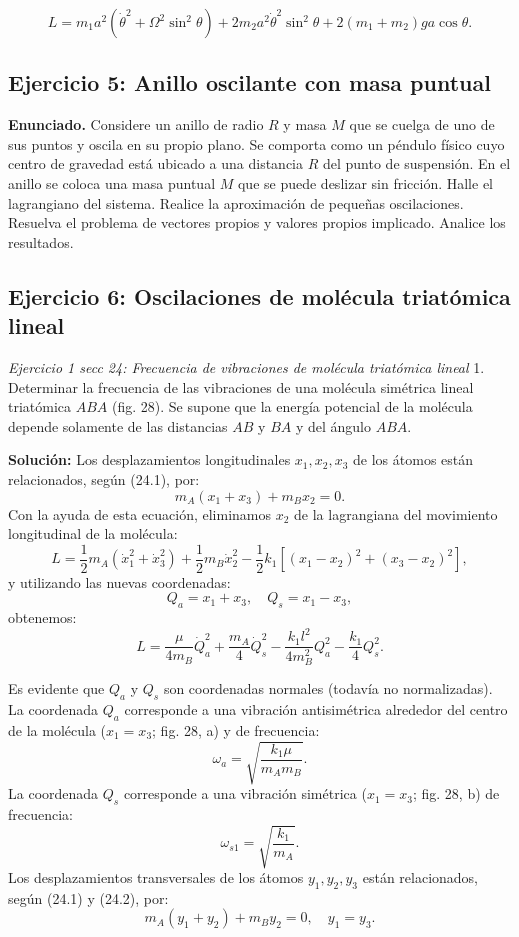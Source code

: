 \documentclass[12pt]{article}
\begin{document}
$$
L = m_1 a^2 (\dot{\theta}^2 + \Omega^2 \sin^2 \theta) + 2 m_2 a^2 \dot{\theta}^2 \sin^2 \theta + 2 (m_1 + m_2) g a \cos \theta.
$$

\subsection{Ejercicio 5: Anillo oscilante con masa puntual}
\textbf{Enunciado.} Considere un anillo de radio $R$ y masa $M$ que se cuelga de uno de sus puntos y oscila en su propio plano. Se comporta como un péndulo físico cuyo centro de gravedad está ubicado a una distancia $R$ del punto de suspensión. En el anillo se coloca una masa puntual $M$ que se puede deslizar sin fricción. Halle el lagrangiano del sistema. Realice la aproximación de pequeñas oscilaciones. Resuelva el problema de vectores propios y valores propios implicado. Analice los resultados.

\subsection{Ejercicio 6: Oscilaciones de molécula triatómica lineal}
\textit{Ejercicio 1 secc 24: Frecuencia de vibraciones de molécula triatómica lineal}
1. Determinar la frecuencia de las vibraciones de una molécula simétrica lineal triatómica $ABA$ (fig. 28). Se supone que la energía potencial de la molécula depende solamente de las distancias $AB$ y $BA$ y del ángulo $ABA$.

\textbf{Solución:} Los desplazamientos longitudinales $x_1, x_2, x_3$ de los átomos están relacionados, según (24.1), por:
\[
m_A(x_1 + x_3) + m_B x_2 = 0.
\]
Con la ayuda de esta ecuación, eliminamos $x_2$ de la lagrangiana del movimiento longitudinal de la molécula:
\[
L = \frac{1}{2}m_A(\dot{x}_1^2 + \dot{x}_3^2) + \frac{1}{2}m_B \dot{x}_2^2 - \frac{1}{2}k_1[(x_1 - x_2)^2 + (x_3 - x_2)^2],
\]
y utilizando las nuevas coordenadas:
\[
Q_a = x_1 + x_3, \quad Q_s = x_1 - x_3,
\]
obtenemos:
\[
L = \frac{\mu}{4m_B} \dot{Q}_a^2 + \frac{m_A}{4} \dot{Q}_s^2 - \frac{k_1 l^2}{4m_B^2} Q_a^2 - \frac{k_1}{4} Q_s^2.
\]

Es evidente que $Q_a$ y $Q_s$ son coordenadas normales (todavía no normalizadas). La coordenada $Q_a$ corresponde a una vibración antisimétrica alrededor del centro de la molécula ($x_1 = x_3$; fig. 28, a) y de frecuencia:
\[
\omega_a = \sqrt{\frac{k_1 \mu}{m_A m_B}}.
\]
La coordenada $Q_s$ corresponde a una vibración simétrica ($x_1 = x_3$; fig. 28, b) de frecuencia:
\[
\omega_{s1} = \sqrt{\frac{k_1}{m_A}}.
\]
Los desplazamientos transversales de los átomos $y_1, y_2, y_3$ están relacionados, según (24.1) y (24.2), por:
\[
m_A(y_1 + y_2) + m_B y_2 = 0, \quad y_1 = y_3.
\]
\end{document}
